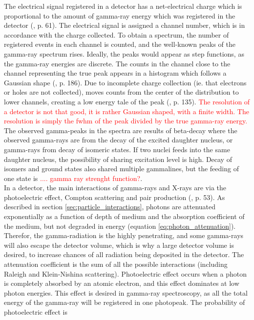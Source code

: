 \noindent 
The electrical signal registered in a detector has a net-electrical charge which is proportional to the amount of gamma-ray energy which was registered in the detector (\cite{Gilmore2008}, p. 61). The electrical signal is assigned a channel number, which is in accordance with the charge collected. To obtain a spectrum, the number of registered events in each channel is counted, and the well-known peaks of the gamma-ray spectrum rises. Ideally, the peaks would appear as step functions, as the gamma-ray energies are discrete. The counts in the channel close to the channel representing the true peak appears in a histogram which follows a Gaussian shape  (\cite{Gilmore2008}, p. 186). Due to incomplete charge collection (ie. that electrons or holes are not collected), moves counts from the center of the distribution to lower channels, creating a low energy tale of the peak (\cite{Gilmore2008}, p. 135).  %
\textcolor{red}{The resolution of a detector is not that good, it is rather Gaussian shaped, with a finite width. The resolution is simply the fwhm of the peak divided by the true gamma-ray energy. } \\

The observed gamma-peaks in the spectra are results of beta-decay where the observed gamma-rays are from the decay of the excited daughter nucleus, or gamma-rays from decay of isomeric states. If two nuclei feeds into the same daughter nucleus, the possibility of sharing excitation level is high. Decay of isomers and ground states also shared multiple gammalines, but the feeding of one state is \textcolor{red}{....  gamma ray strenght function?}. \\

\noindent 
In a detector, the main interactions of gamma-rays and X-rays are via the photoelectric effect, Compton scattering and pair production (\cite{Leo1994}, p. 53).  As described in section \ref{sec:particle_interactions}, photons are attenuated exponentially as a function of depth of medium and the absorption coefficient of the medium, but not degraded in energy (equation \ref{eq:photon_attenuation}). Therefor, the gamma-radiation is the highly penetrating, and some gamma-rays will also escape the detector volume, which is why a large detector volume is desired, to increase chances of all radiation being deposited in the detector. The attenuation coefficient is the sum of all the possible interactions (including Raleigh and Klein-Nishina scattering). Photoelectric effect occurs when a photon is completely absorbed by an atomic electron, and this effect dominates at low photon energies. This effect is desired in gamma-ray spectroscopy, as all the total energy of the gamma-ray will be registered in one photopeak. The probability of photoelectric effect is 

